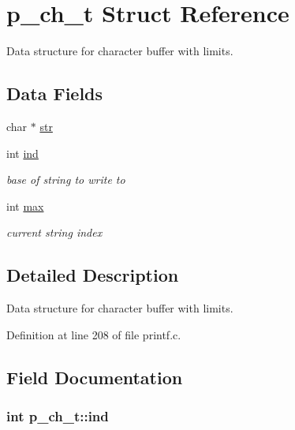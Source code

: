 \hypertarget{structp__ch__t}{}\section{p\+\_\+ch\+\_\+t Struct Reference}
\label{structp__ch__t}


Data structure for character buffer with limits.  


\subsection*{Data Fields}
\begin{DoxyCompactItemize}
\item 
char $\ast$ \hyperlink{structp__ch__t_aa3c8616342a2717bc714bf1b6d00516f}{str}
\item 
int \hyperlink{structp__ch__t_a9d6834d749cd9232a16cb20b598fe90d}{ind}
\begin{DoxyCompactList}\small\item\em base of string to write to \end{DoxyCompactList}\item 
int \hyperlink{structp__ch__t_a0dee9f28e498d427e53051b7e1846d34}{max}
\begin{DoxyCompactList}\small\item\em current string index \end{DoxyCompactList}\end{DoxyCompactItemize}


\subsection{Detailed Description}
Data structure for character buffer with limits. 

Definition at line 208 of file printf.\+c.



\subsection{Field Documentation}
\subsubsection[{\texorpdfstring{ind}{ind}}]{\setlength{\rightskip}{0pt plus 5cm}int p\+\_\+ch\+\_\+t\+::ind}\hypertarget{structp__ch__t_a9d6834d749cd9232a16cb20b598fe90d}{}\label{structp__ch__t_a9d6834d749cd9232a16cb20b598fe90d}


